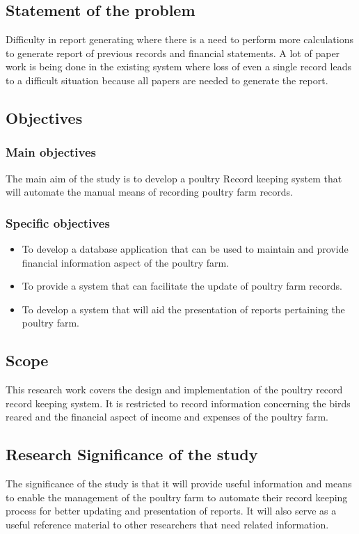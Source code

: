 \documentclass[12pt,]{article}
\begin{document}
\subsection{Statement of the problem}
Difficulty in report generating where there is a need to perform more calculations to generate report of previous records and financial statements. A lot of paper work is being done in the existing system where loss of even a  single record leads to a difficult situation because all papers are needed to generate the report.

\subsection{Objectives}
\subsubsection{Main objectives}
The main aim of the study is to develop a poultry Record keeping system that will automate the manual means of recording poultry farm records.


\subsubsection{Specific objectives}
\begin{itemize}
\item To develop a database application that can be used to maintain and provide financial information aspect of the poultry farm.
\item To provide a system that can facilitate the update of poultry farm records.
\item To develop a system that will aid the presentation of reports pertaining the poultry farm.
\end{itemize}

\subsection{Scope}
This research work covers the design and implementation of the poultry record record keeping system. It is restricted to record information concerning the birds reared and the financial aspect of income and expenses of the poultry farm.
\subsection{Research Significance of the study}
The significance of the study is that it will provide useful information and means to enable the management of the poultry farm to automate their record keeping process for better updating and presentation of reports. It will also serve as a useful reference material to other researchers that need related information.
\end{document}
